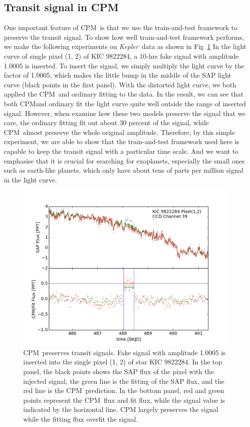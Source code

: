 \documentclass[12pt, preprint]{aastex}
\newcommand{\project}[1]{\textsl{#1}}
\newcommand{\Kepler}{\project{Kepler}}
\newcommand{\name}{CPM}
\begin{document}
\subsection{Transit signal in \name}
One important feature of \name\ is that we use the train-and-test framework to preserve 
the transit signal. To show how well train-and-test framework performs, we make the
following experiments on \Kepler\ data as shown in Fig~\ref{distortion}
In the light curve of single pixel (1, 2) of KIC 9822284, a 10-hrs fake signal 
with amplitude 1.0005 is inserted. To insert the signal, we simply multiply the light curve 
by the factor of 1.0005, which makes the little bump in the middle of the SAP light curve 
(black points in the first panel). With the distorted light curve, we both applied the 
\name\ and ordinary fitting to the data. In the result, we can see that both \name and 
ordinary fit the light curve quite well outside the range of inserted signal. However, 
when examine how these two models preserve the signal that we care, the ordinary
fitting fit out about 30 percent of the signal, while \name\ almost preserve the whole 
original amplitude. Therefore,  by this simple experiment, we are able to show that 
the train-and-test framework used here is capable to keep the transit signal with 
a particular time scale. And we want to emphasise that it is crucial for searching for
exoplanets, especially the small ones such as earth-like planets, which only have  
about tens of parts per million signal in the light curve.

\begin{figure}[htb]
\centering
\includegraphics[width=\columnwidth]{distortion_9822284_normal}
\caption{\label{distortion} \name\ preserves transit signals. 
Fake signal with amplitude 1.0005 is inserted into the single pixel (1, 2) of star KIC 9822284. 
In the top panel, the black points shows the SAP flux of the pixel with the injected signal, 
the green line is the fitting of the SAP flux, and the red line is the \name\ prediction. 
In the bottom panel, red and green points represent the \name\ flux and fit flux, 
while the signal value is indicated by the horizontal line. 
CPM largely preserves the signal while the fitting flux overfit the signal.}
\end{figure}
\end{document}
